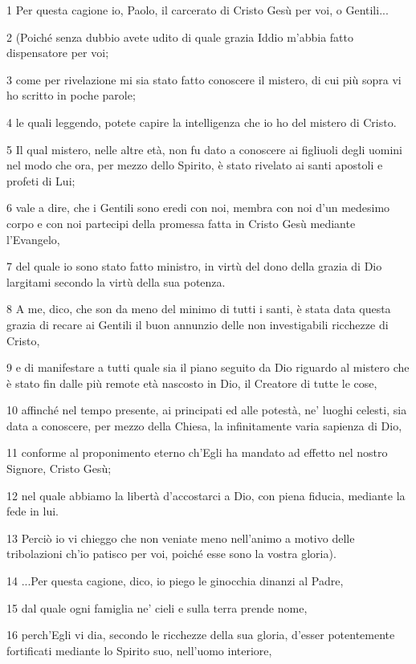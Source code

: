 \par 1 Per questa cagione io, Paolo, il carcerato di Cristo Gesù per voi, o Gentili...
\par 2 (Poiché senza dubbio avete udito di quale grazia Iddio m'abbia fatto dispensatore per voi;
\par 3 come per rivelazione mi sia stato fatto conoscere il mistero, di cui più sopra vi ho scritto in poche parole;
\par 4 le quali leggendo, potete capire la intelligenza che io ho del mistero di Cristo.
\par 5 Il qual mistero, nelle altre età, non fu dato a conoscere ai figliuoli degli uomini nel modo che ora, per mezzo dello Spirito, è stato rivelato ai santi apostoli e profeti di Lui;
\par 6 vale a dire, che i Gentili sono eredi con noi, membra con noi d'un medesimo corpo e con noi partecipi della promessa fatta in Cristo Gesù mediante l'Evangelo,
\par 7 del quale io sono stato fatto ministro, in virtù del dono della grazia di Dio largitami secondo la virtù della sua potenza.
\par 8 A me, dico, che son da meno del minimo di tutti i santi, è stata data questa grazia di recare ai Gentili il buon annunzio delle non investigabili ricchezze di Cristo,
\par 9 e di manifestare a tutti quale sia il piano seguito da Dio riguardo al mistero che è stato fin dalle più remote età nascosto in Dio, il Creatore di tutte le cose,
\par 10 affinché nel tempo presente, ai principati ed alle potestà, ne' luoghi celesti, sia data a conoscere, per mezzo della Chiesa, la infinitamente varia sapienza di Dio,
\par 11 conforme al proponimento eterno ch'Egli ha mandato ad effetto nel nostro Signore, Cristo Gesù;
\par 12 nel quale abbiamo la libertà d'accostarci a Dio, con piena fiducia, mediante la fede in lui.
\par 13 Perciò io vi chieggo che non veniate meno nell'animo a motivo delle tribolazioni ch'io patisco per voi, poiché esse sono la vostra gloria).
\par 14 ...Per questa cagione, dico, io piego le ginocchia dinanzi al Padre,
\par 15 dal quale ogni famiglia ne' cieli e sulla terra prende nome,
\par 16 perch'Egli vi dia, secondo le ricchezze della sua gloria, d'esser potentemente fortificati mediante lo Spirito suo, nell'uomo interiore,
